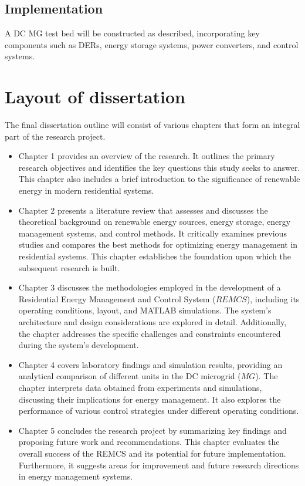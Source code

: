\subsection{Implementation}
A DC MG test bed will be constructed as described, incorporating key components such as DERs, energy storage systems, power converters, and control systems.

\section{Layout of dissertation}
The final dissertation outline will consist of various chapters that form an integral part of the
research project.
\begin{itemize}
	\item Chapter 1 provides an overview of the research. It outlines the primary research objectives
	and identifies the key questions this study seeks to answer. This chapter also includes a
	brief introduction to the significance of renewable energy in modern residential systems.
	\item Chapter 2 presents a literature review that assesses and discusses the theoretical
		background on renewable energy sources, energy storage, energy management systems,
		and control methods. It critically examines previous studies and compares the best methods
		for optimizing energy management in residential systems. This chapter establishes the
		foundation upon which the subsequent research is built.
	\item Chapter 3 discusses the methodologies employed in the development of a Residential
		Energy Management and Control System ($REMCS$), including its operating conditions,
		layout, and MATLAB simulations. The system's architecture and design considerations are
		explored in detail. Additionally, the chapter addresses the specific challenges and
		constraints encountered during the system's development.
	\item Chapter 4 covers laboratory findings and simulation results, providing an analytical
		comparison of different units in the DC microgrid ($MG$). The chapter interprets data
		obtained from experiments and simulations, discussing their implications for energy
		management. It also explores the performance of various control strategies under different
		operating conditions.
	\item Chapter 5 concludes the research project by summarizing key findings and proposing
		future work and recommendations. This chapter evaluates the overall success of the
		REMCS and its potential for future implementation. Furthermore, it suggests areas for
		improvement and future research directions in energy management systems.
\end{itemize}

